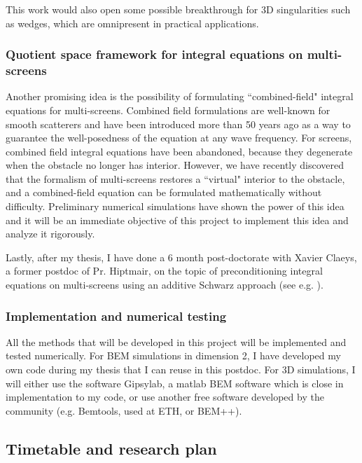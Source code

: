 \documentclass[]{report}
\begin{document}
This work would also open some possible breakthrough for 3D singularities such as wedges, which are omnipresent in practical applications. 

\subsubsection*{Quotient space framework for integral equations on multi-screens}

Another promising idea is the possibility of formulating ``combined-field" integral equations for multi-screens. Combined field formulations are well-known for smooth scatterers and have been introduced more than 50 years ago \cite{brakhage1965dirichletsehe} as a way to guarantee the well-posedness of the equation at any wave frequency. For screens, combined field integral equations have been abandoned, because they degenerate when the obstacle no longer has interior. 
However, we have recently discovered that the formalism of multi-screens restores a ``virtual" interior to the obstacle, and a combined-field equation can be formulated mathematically without difficulty. Preliminary numerical simulations have shown the power of this idea and it will be an immediate objective of this project to implement this idea and analyze it rigorously.

Lastly, after my thesis, I have done a 6 month post-doctorate with Xavier Claeys, a former postdoc of Pr. Hiptmair, on the topic of preconditioning integral equations on multi-screens using an additive Schwarz approach (see e.g. \cite{marchand2019two}).

\subsubsection*{Implementation and numerical testing}

All the methods that will be developed in this project will be implemented and tested numerically. For BEM simulations in dimension 2, I have developed my own code during my thesis that I can reuse in this postdoc. For 3D simulations, I will either use the software Gipsylab, a matlab BEM software which is close in implementation to my code, or use another free software developed by the community (e.g. Bemtools, used at ETH, or BEM++).



\subsection*{Timetable and research plan}
\end{document}
